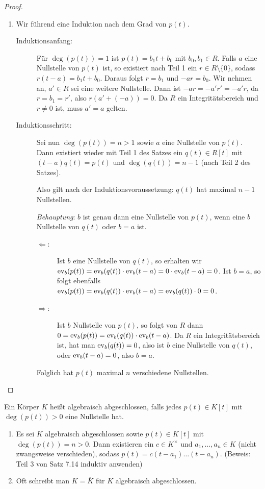 \documentclass[12pt,a4paper]{scrartcl}
\begin{document}
\begin{proof}
\begin{enumerate}
		\item Wir führend eine Induktion nach dem Grad von $p(t)$.
		\begin{description}
			\item[Induktionsanfang:] Für $\deg(p(t)) = 1$ ist $p(t) = b_1t+b_0$ mit $b_0,b_1\in R$. Falls $a$ eine Nullstelle von $p(t)$ ist, so existiert nach Teil 1 ein $r\in R\setminus\{0\}$, sodass $r(t-a) = b_1t+b_0$. Daraus folgt $r = b_1$ und $-ar = b_0$. Wir nehmen an, $a' \in R$ sei eine weitere Nullstelle. Dann ist $-ar = -a'r' = -a'r$, da $r = b_1 = r'$, also $r(a'+(-a)) = 0$. Da $R$ ein Integritätsbereich und $r\neq 0$ ist, muss $a' = a$ gelten.
			\item[Induktionsschritt:] Sei nun $\deg(p(t)) = n>1$ sowie $a$ eine Nullstelle von $p(t)$. Dann existiert wieder mit Teil 1 des Satzes ein $q(t)\in R[t]$ mit $(t-a) q(t) = p(t)$ und $\deg(q(t)) = n-1$ (nach Teil 2 des Satzes).
			
			Also gilt nach der Induktionsvoraussetzung: $q(t)$ hat maximal $n-1$ Nullstellen.
			
			\emph{Behauptung}: $b$ ist genau dann eine Nullstelle von $p(t)$, wenn eine $b$ Nullstelle von $q(t)$ oder $b = a$ ist.
			
			\begin{description}
				\item[\glqq$\Leftarrow$\grqq:] Ist $b$ eine Nullstelle von $q(t)$, so erhalten wir $\operatorname{ev}_{b}(p(t)) = \operatorname{ev}_{b}(q(t))\cdot \operatorname{ev}_b(t-a) = 0\cdot \operatorname{ev}_{b}(t-a) = 0$. Ist $b=a$, so folgt ebenfalls $\operatorname{ev}_{b}(p(t)) = \operatorname{ev}_{b}(q(t))\cdot \operatorname{ev}_b(t-a) = \operatorname{ev}_{b}(q(t))\cdot 0 = 0$.
				\item[\glqq$\Rightarrow$\grqq:] Ist $b$ Nullstelle von $p(t)$, so folgt von $R$ dann $0 = \operatorname{ev}_{b}(p(t)) = \operatorname{ev}_{b}(q(t))\cdot \operatorname{ev}_{b}(t-a)$. Da $R$ ein Integritätsbereich ist, hat man $\operatorname{ev}_{b}(q(t)) = 0$, also ist $b$ eine Nullstelle von $q(t)$, oder $\operatorname{ev}_b(t-a) = 0$, also $b=a$.
			\end{description}
			
			Folglich hat $p(t)$ maximal $n$ verschiedene Nullstellen.
		\end{description}
	\end{enumerate}
\end{proof}


\begin{defi}
	Ein Körper $K$ heißt algebraisch abgeschlossen, falls jedes $p(t)\in K[t]$ mit $\deg(p(t))>0$ eine Nullstelle hat.
\end{defi}
\begin{bem}
	\leavevmode
	\begin{enumerate}
		\item Es sei $K$ algebraisch abgeschlossen sowie $p(t)\in K[t]$ mit $\deg(p(t)) =n > 0$. Dann existieren ein $c\in K^{\times}$ und $ a_1,\dots,a_n\in K$ (nicht zwangsweise verschieden), sodass $p(t) = c(t-a_1)\dots (t-a_n)$. (Beweis: Teil 3 von Satz 7.14 induktiv anwenden)
		\item Oft schreibt man $K = \overline{K}$ für $K$ algebraisch abgeschlossen.
	\end{enumerate}
\end{bem}
\end{document}
